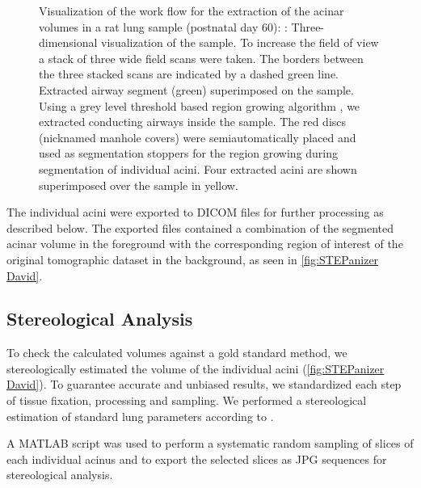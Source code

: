 \documentclass[paper=a4,twocolumn=true,DIV=calc,abstract,english]{scrartcl}
\newlength\imagescale		%
\begin{document}
\begin{figure}
{\begin{tikzpicture}[x=\imagescale,y=-\imagescale]
		\end{tikzpicture}%
		\label{subfig:extracted acini}%
		}%
	\caption{%
		Visualization of the work flow for the extraction of the acinar volumes in a rat lung sample (postnatal day 60): %
		\protect{}: Three-dimensional visualization of the sample.
		To increase the field of view a stack of three wide field scans were taken.
		The borders between the three stacked scans are indicated by a dashed green line.
		\protect{} Extracted airway segment (green) superimposed on the sample.
		Using a grey level threshold based region growing algorithm , we extracted conducting airways inside the sample.
		The red discs (nicknamed manhole covers) were semiautomatically placed and used as segmentation stoppers for the region growing during segmentation of individual acini.
		\protect{} Four extracted acini are shown superimposed over the sample in yellow.
	}
	\label{fig:workflow}
\end{figure}

The individual acini were exported to DICOM files for further processing as described below.
The exported files contained a combination of the segmented acinar volume in the foreground with the corresponding region of interest of the original tomographic dataset in the background, as seen in \autoref{fig:STEPanizer David}.

\subsection{Stereological Analysis}
\label{sec:stereological analysis}
To check the calculated volumes against a gold standard method, we stereologically estimated the volume of the individual acini (\autoref{fig:STEPanizer David}).
To guarantee accurate and unbiased results, we standardized each step of tissue fixation, processing and sampling. We performed a stereological estimation of standard lung parameters according to \citet{Hsia2010}.

A MATLAB script was used to perform a systematic random sampling of slices of each individual acinus and to export the selected slices as JPG sequences for stereological analysis.
\end{document}
